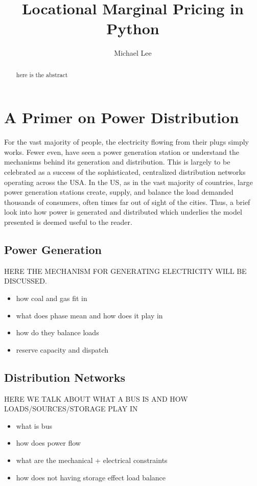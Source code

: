 \documentclass{article}
\begin{document}
\title{Locational Marginal Pricing in Python}
\author{Michael Lee}
\maketitle

\begin{abstract}
here is the abstract 
\end{abstract}

\section{A Primer on Power Distribution}
For the vast majority of people, the electricity flowing from their plugs simply works. Fewer even, have seen a power generation station or understand the mechanisms behind its generation and distribution. This is largely to be celebrated as a success of the sophisticated, centralized distribution networks operating across the USA. In the US, as in the vast majority of countries, large power generation stations create, supply, and balance the load demanded thousands of consumers, often times far out of sight of the cities. Thus, a brief look into how power is generated and distributed which underlies the model presented is deemed useful to the reader. 

\subsection{Power Generation}
HERE THE MECHANISM FOR GENERATING ELECTRICITY WILL BE DISCUSSED. 

\begin{itemize}
	\item how coal and gas fit in
	\item what does phase mean and how does it play in
	\item how do they balance loads
	\item reserve capacity and dispatch
\end{itemize}

\subsection{Distribution Networks}
HERE WE TALK ABOUT WHAT A BUS IS AND HOW LOADS/SOURCES/STORAGE PLAY IN
\begin{itemize}
	\item what is bus
	\item how does power flow
	\item what are the mechanical + electrical constraints
	\item how does not having storage effect load balance
\end{itemize}
\end{document}
